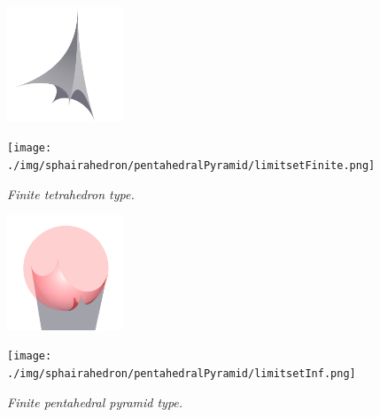 \documentclass[dvipdfmx]{interact}
\theoremstyle{plain}%
\theoremstyle{definition}
\theoremstyle{remark}
\theoremstyle{problemstyle}
\begin{document}
\begin{figure}[H]
 \begin{minipage}{0.5\textwidth}
  \begin{minipage}[t]{0.24\textwidth}
   \centering
   \includegraphics[width=1.35in, height=1.35in, keepaspectratio]{./img/sphairahedron/pentahedralPyramid/sphairahedronFinite.png}
  \end{minipage}
  \hspace*{\fill}
  \begin{minipage}[t]{0.24\textwidth}
   \centering
   \texttt{[image: ./img/sphairahedron/pentahedralPyramid/limitsetFinite.png]}
  \end{minipage}
  \hspace*{\fill}
  \caption{\textit{Finite tetrahedron type.}}
  \label{fig:pentahedralPyramidFinite}
 \end{minipage}
 \hspace*{\fill}
 \begin{minipage}{0.5\textwidth}
  \begin{minipage}[t]{0.24\textwidth}
   \centering
   \includegraphics[width=1.35in, height=1.35in, keepaspectratio]{./img/sphairahedron/pentahedralPyramid/sphairahedronInf.png}
  \end{minipage}
  \hspace*{\fill}
  \begin{minipage}[t]{0.24\textwidth}
   \centering
   \texttt{[image: ./img/sphairahedron/pentahedralPyramid/limitsetInf.png]}
  \end{minipage}
  \hspace*{\fill}
  \caption{\textit{Finite pentahedral pyramid type.}}
  \label{fig:pentahedralPyramidInf}
 \end{minipage}
\end{figure}
\end{document}
